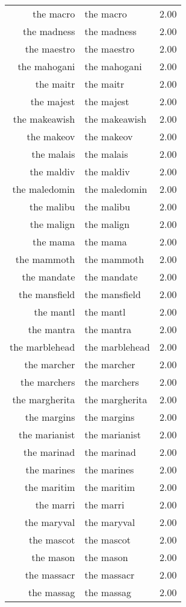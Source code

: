 \begin{table}[ht]
\begin{tabular}{rlr}
  the macro & the macro & 2.00 \\ 
  the madness & the madness & 2.00 \\ 
  the maestro & the maestro & 2.00 \\ 
  the mahogani & the mahogani & 2.00 \\ 
  the maitr & the maitr & 2.00 \\ 
  the majest & the majest & 2.00 \\ 
  the makeawish & the makeawish & 2.00 \\ 
  the makeov & the makeov & 2.00 \\ 
  the malais & the malais & 2.00 \\ 
  the maldiv & the maldiv & 2.00 \\ 
  the maledomin & the maledomin & 2.00 \\ 
  the malibu & the malibu & 2.00 \\ 
  the malign & the malign & 2.00 \\ 
  the mama & the mama & 2.00 \\ 
  the mammoth & the mammoth & 2.00 \\ 
  the mandate & the mandate & 2.00 \\ 
  the mansfield & the mansfield & 2.00 \\ 
  the mantl & the mantl & 2.00 \\ 
  the mantra & the mantra & 2.00 \\ 
  the marblehead & the marblehead & 2.00 \\ 
  the marcher & the marcher & 2.00 \\ 
  the marchers & the marchers & 2.00 \\ 
  the margherita & the margherita & 2.00 \\ 
  the margins & the margins & 2.00 \\ 
  the marianist & the marianist & 2.00 \\ 
  the marinad & the marinad & 2.00 \\ 
  the marines & the marines & 2.00 \\ 
  the maritim & the maritim & 2.00 \\ 
  the marri & the marri & 2.00 \\ 
  the maryval & the maryval & 2.00 \\ 
  the mascot & the mascot & 2.00 \\ 
  the mason & the mason & 2.00 \\ 
  the massacr & the massacr & 2.00 \\ 
  the massag & the massag & 2.00 \\ 

\end{tabular}
\end{table}
